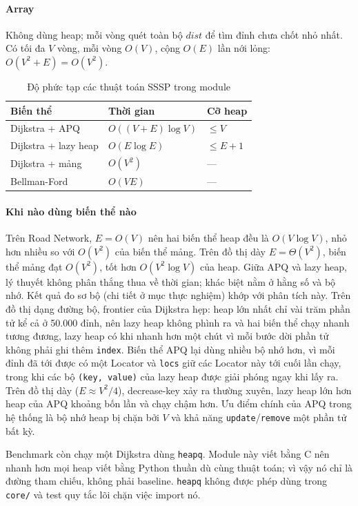 \paragraph{Array}
Không dùng heap; mỗi vòng quét toàn bộ $\mathit{dist}$ để tìm đỉnh chưa chốt nhỏ nhất. Có tối đa $V$ vòng, mỗi vòng $O(V)$, cộng $O(E)$ lần nới lỏng: $O(V^2+E) = O(V^2)$.

\begin{table}[t]
\centering
\caption{Độ phức tạp các thuật toán SSSP trong module}
\label{tab:sssp-cost}
\begin{tabular}{@{}lll@{}}
\toprule
Biến thể & Thời gian & Cỡ heap \\
\midrule
Dijkstra + APQ & $O((V+E)\log V)$ & $\le V$ \\
Dijkstra + lazy heap & $O(E\log E)$ & $\le E+1$ \\
Dijkstra + mảng & $O(V^2)$ & --- \\
Bellman-Ford & $O(VE)$ & --- \\
\bottomrule
\end{tabular}
\end{table}

\paragraph{Khi nào dùng biến thể nào}
Trên Road Network, $E = O(V)$ nên hai biến thể heap đều là $O(V\log V)$, nhỏ hơn nhiều so với $O(V^2)$ của biến thể mảng. Trên đồ thị dày $E = \Theta(V^2)$, biến thể mảng đạt $O(V^2)$, tốt hơn $O(V^2\log V)$ của heap. Giữa APQ và lazy heap, lý thuyết không phân thắng thua về thời gian; khác biệt nằm ở hằng số và bộ nhớ. Kết quả đo sơ bộ (chi tiết ở mục thực nghiệm) khớp với phân tích này. Trên đồ thị dạng đường bộ, frontier của Dijkstra hẹp: heap lớn nhất chỉ vài trăm phần tử kể cả ở 50.000 đỉnh, nên lazy heap không phình ra và hai biến thể chạy nhanh tương đương, lazy heap có khi nhanh hơn một chút vì mỗi bước dời phần tử không phải ghi thêm \texttt{index}. Biến thể APQ lại dùng nhiều bộ nhớ hơn, vì mỗi đỉnh đã tới được có một Locator và \texttt{locs} giữ các Locator này tới cuối lần chạy, trong khi các bộ \texttt{(key, value)} của lazy heap được giải phóng ngay khi lấy ra. Trên đồ thị dày ($E \approx V^2/4$), decrease-key xảy ra thường xuyên, lazy heap lớn hơn heap của APQ khoảng bốn lần và chạy chậm hơn. Ưu điểm chính của APQ trong hệ thống là bộ nhớ heap bị chặn bởi $V$ và khả năng \texttt{update}/\texttt{remove} một phần tử bất kỳ.

Benchmark còn chạy một Dijkstra dùng \texttt{heapq}. Module này viết bằng C nên nhanh hơn mọi heap viết bằng Python thuần dù cùng thuật toán; vì vậy nó chỉ là đường tham chiếu, không phải baseline. \texttt{heapq} không được phép dùng trong \texttt{core/} và test quy tắc lõi chặn việc import nó.

